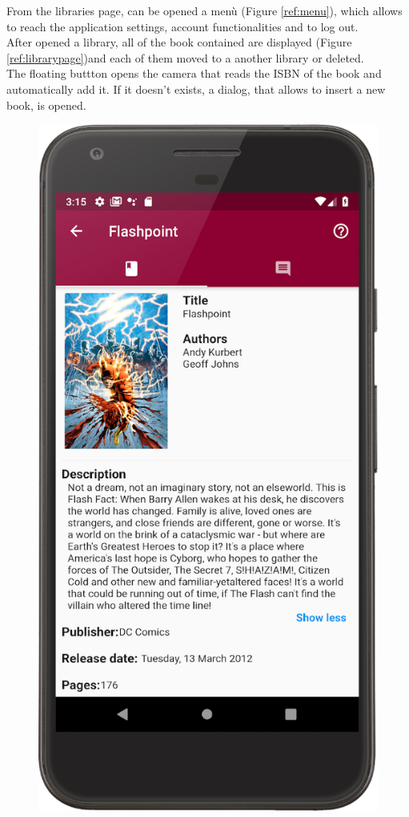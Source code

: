 From the libraries page, can be opened a menù (Figure \ref{ref:menu}), which allows to reach the application settings, 
account functionalities and to log out.\\ After opened a library, 
all of the book contained are displayed (Figure \ref{ref:librarypage})and each of them moved to a another library or deleted.\\ 
The floating buttton opens the camera that reads the ISBN of the book and automatically add it. 
If it doesn’t exists, a dialog, that allows to insert a new book, is opened.
\clearpage
\begin{figure}[!htb]
    \begin{minipage}[b]{0.3\textwidth}
        \centering
        \includegraphics[scale=1]{images/book-info-page.png}

\end{minipage}
\end{figure}

